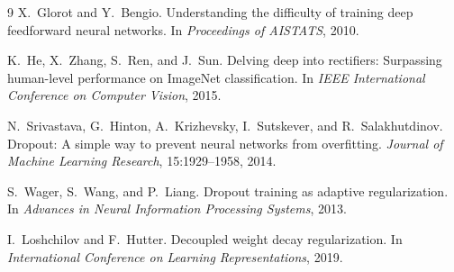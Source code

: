 \begin{thebibliography}{9}
X.~Glorot and Y.~Bengio.
\newblock Understanding the difficulty of training deep feedforward neural networks.
\newblock In \emph{Proceedings of AISTATS}, 2010.

K.~He, X.~Zhang, S.~Ren, and J.~Sun.
\newblock Delving deep into rectifiers: Surpassing human-level performance on ImageNet classification.
\newblock In \emph{IEEE International Conference on Computer Vision}, 2015.

N.~Srivastava, G.~Hinton, A.~Krizhevsky, I.~Sutskever, and R.~Salakhutdinov.
\newblock Dropout: A simple way to prevent neural networks from overfitting.
\newblock \emph{Journal of Machine Learning Research}, 15:1929--1958, 2014.

S.~Wager, S.~Wang, and P.~Liang.
\newblock Dropout training as adaptive regularization.
\newblock In \emph{Advances in Neural Information Processing Systems}, 2013.

I.~Loshchilov and F.~Hutter.
\newblock Decoupled weight decay regularization.
\newblock In \emph{International Conference on Learning Representations}, 2019.
\end{thebibliography}


